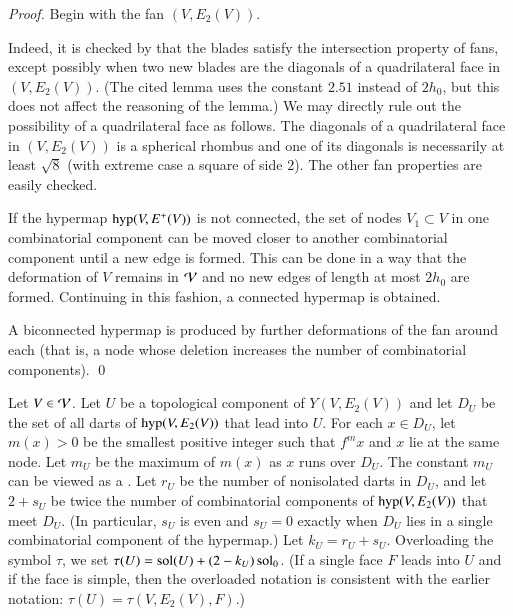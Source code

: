 \documentclass{llncs}
\def\op#1{{\hbox{#1}}}
\begin{document}
\begin{proof}
  Begin with the  fan $(V,E_2(V))$.  

   Indeed, it is checked by
  \cite[Lemma~4.30]{Hales:2006:DCG} that the blades satisfy the
  intersection property of fans, except possibly when two new blades
  are the diagonals of a quadrilateral face in $(V,E_2(V))$.  (The
  cited lemma uses the constant $2.51$ instead of $2h_0$, but this
  does not affect the reasoning of the lemma.) 
We may directly rule out the possibility of a quadrilateral face as follows.
 The diagonals of a quadrilateral face
  in $(V,E_2(V))$ is a spherical rhombus and one of its diagonals is
  necessarily at least $\sqrt8$ (with extreme case a square of side
  $2$).  The other fan properties are easily checked.

  If the hypermap $\op{hyp}(V,E^+(V))$ is not connected,
  the set of nodes $V_1\subset V$ in one combinatorial component can
  be moved closer to another combinatorial component until a new edge
  is formed.  This can be done in a way that the deformation of $V$
  remains in ${\mathcal V}$ and no new edges of length at most $2h_0$ are formed.
  Continuing in this fashion, a connected hypermap is obtained.

A biconnected hypermap is produced by  further
 deformations of the fan around each   (that is, a node 
whose deletion increases the number of combinatorial components).
\qed\end{proof}





\begin{definition}[$D_U$,~$m_U$,~$r_U$,~$s_U$,~$k_U$,~$\tau(U)$]
  Let $V\in {\mathcal V}$.  Let $U$ be a topological component of
  $Y(V,E_2(V))$ and let $D_U$ be the set of all darts of $\op{hyp}(V,E_2(V))$
 that lead into
  $U$.   For each
  $x\in D_U$, let $m(x) >0$ be the smallest positive integer such that
  $f^{m} x$ and $x$ lie at the same node.  Let $m_U$ be the maximum of
  $m(x)$  as $x$ runs over $D_U$.  The constant $m_U$ can be viewed as
  a .  
Let $r_U$ be the number of nonisolated darts in $D_U$, and let $2+s_U$ be twice the
  number of combinatorial components of $\op{hyp}(V,E_2(V))$ that
  meet $D_U$.  (In particular, $s_U$ is even and $s_U=0$ exactly when $D_U$ lies in a 
single combinatorial component of the hypermap.)
Let $k_U=r_U+s_U$.  Overloading the symbol $\tau$, we
  set $\tau(U) = \operatorname{sol}(U) +  (2-k_U)\operatorname{sol}_0$.   (If a single  face $F$ leads into
  $U$ and if the face is simple, then the overloaded notation is consistent
with the earlier notation: $\tau(U) = \tau(V,E_2(V),F)$.)
%
\end{definition}
\end{document}
